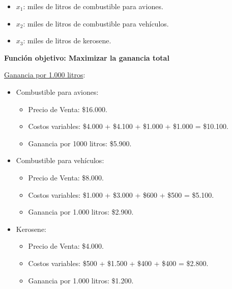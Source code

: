 \documentclass[10pt,a4paper]{article}
\begin{document}
\begin{enumerate}[label=\textbf{\sffamily\large\arabic*.}]
\begin{itemize}
        \item $x_{1}$: miles de litros de combustible para aviones.
        \item $x_{2}$: miles de litros de combustible para vehículos.
        \item $x_{3}$: miles de litros de kerosene. \\

    \end{itemize}

    \textbf{Función objetivo: Maximizar la ganancia total}

    \vspace{0.5em}

    \underline{Ganancia por 1.000 litros}:

    \begin{itemize}

        \item Combustible para aviones:
        \begin{itemize}

            \item Precio de Venta: \$16.000.
            \item Costos variables: \$4.000 + \$4.100 + \$1.000 + \$1.000 = \$10.100.
            \item Ganancia por 1000 litros: \$5.900. \\
    
        \end{itemize}

        \item Combustible para vehículos:
        \begin{itemize}

            \item Precio de Venta: \$8.000.
            \item Costos variables: \$1.000 + \$3.000 + \$600 + \$500 = \$5.100.
            \item Ganancia por 1.000 litros: \$2.900. \\
    
        \end{itemize}

        \item Kerosene:
        \begin{itemize}

            \item Precio de Venta: \$4.000.
            \item Costos variables: \$500 + \$1.500 + \$400 + \$400 = \$2.800.
            \item Ganancia por 1.000 litros: \$1.200. \\
    

\end{itemize}
\end{itemize}
\end{enumerate}
\end{document}
